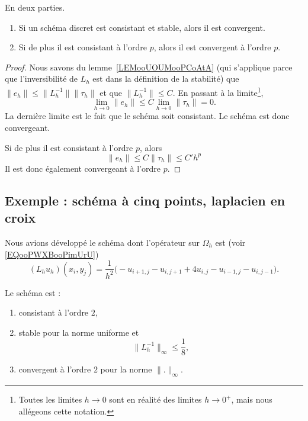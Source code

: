 \begin{theorem}     \label{THOooEPQQooUQMcgF}
	En deux parties.
	\begin{enumerate}
		\item
		      Si un schéma discret est consistant et stable, alors il est convergent.
		\item
		      Si de plus il est consistant à l'ordre \( p\), alors il est convergent à l'ordre \( p\).
	\end{enumerate}
\end{theorem}

\begin{proof}
	Nous savons du lemme~\ref{LEMooUOUMooPCoAtA} (qui s'applique parce que l'inversibilité de \( L_h\) est dans la définition de la stabilité) que  \( \| e_h \|\leq \| L_h^{-1} \| \| \tau_h \|\) et que  \( \| L_h^{-1} \|\leq C  \). En passant à la limite\footnote{Toutes les limites \( h\to 0\) sont en réalité des limites \( h\to 0^+\), mais nous allégeons cette notation.},
	\begin{equation}
		\lim_{h\to 0} \| e_h \|\leq C\lim_{h\to 0} \| \tau_h \|=0.
	\end{equation}
	La dernière limite est le fait que le schéma soit consistant. Le schéma est donc convergeant.

	Si de plus il est consistant à l'ordre \( p\), alors
	\begin{equation}
		\| e_h \|\leq C\| \tau_h \|\leq C'h^p
	\end{equation}
	Il est donc également convergeant à l'ordre \( p\).
\end{proof}

\subsection{Exemple : schéma à cinq points, laplacien en croix}

Nous avions développé le schéma dont l'opérateur sur \( \Omega_h\) est (voir \eqref{EQooPWXBooPimUrU})
\begin{equation}
	(L_hu_h)(x_i,y_j)=\frac{1}{ h^2 }\big( -u_{i+1,j}-u_{i,j+1} +4u_{i,j}-u_{i-1,j}-u_{i,j-1}  \big).
\end{equation}

\begin{proposition}
	Le schéma est :
	\begin{enumerate}
		\item
		      consistant à l'ordre \( 2\),
		\item
		      stable pour la norme uniforme et
		      \begin{equation}
			      \| L_h^{-1} \|_{\infty}\leq \frac{1}{ 8 },
		      \end{equation}
		\item
		      convergent à l'ordre \( 2\) pour la norme \( \| . \|_{\infty}\).
	\end{enumerate}
\end{proposition}

